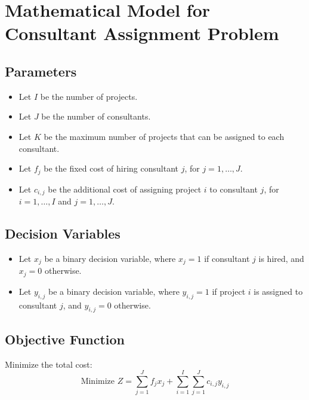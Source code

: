 \documentclass{article}
\begin{document}
\section*{Mathematical Model for Consultant Assignment Problem}

\subsection*{Parameters}
\begin{itemize}
    \item Let \( I \) be the number of projects.
    \item Let \( J \) be the number of consultants.
    \item Let \( K \) be the maximum number of projects that can be assigned to each consultant.
    \item Let \( f_j \) be the fixed cost of hiring consultant \( j \), for \( j = 1, \ldots, J \).
    \item Let \( c_{i,j} \) be the additional cost of assigning project \( i \) to consultant \( j \), for \( i = 1, \ldots, I \) and \( j = 1, \ldots, J \).
\end{itemize}

\subsection*{Decision Variables}
\begin{itemize}
    \item Let \( x_{j} \) be a binary decision variable, where \( x_{j} = 1 \) if consultant \( j \) is hired, and \( x_{j} = 0 \) otherwise.
    \item Let \( y_{i,j} \) be a binary decision variable, where \( y_{i,j} = 1 \) if project \( i \) is assigned to consultant \( j \), and \( y_{i,j} = 0 \) otherwise.
\end{itemize}

\subsection*{Objective Function}
Minimize the total cost:
\[
\text{Minimize } Z = \sum_{j=1}^{J} f_j x_j + \sum_{i=1}^{I} \sum_{j=1}^{J} c_{i,j} y_{i,j}
\]
\end{document}

